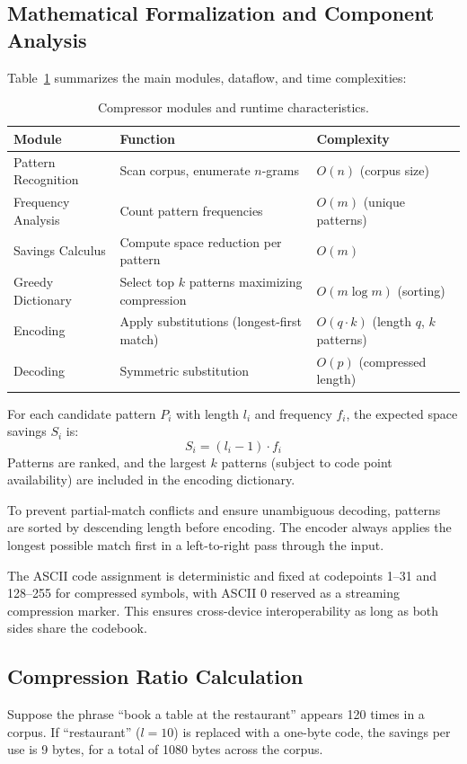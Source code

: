 \documentclass[12pt,openany]{article}
\theoremstyle{definition}
\theoremstyle{definition}
\theoremstyle{definition}
\begin{document}
\subsection*{Mathematical Formalization and Component Analysis}
Table~\ref{tab:compressor-modules} summarizes the main modules, dataflow, and time complexities:
\begin{table}[ht]
\begin{adjustwidth}{-5cm}{-5cm}
\centering
\begin{tabular}{|l|l|l|}
\hline
\textbf{Module} & \textbf{Function} & \textbf{Complexity} \\
\hline
Pattern Recognition   & Scan corpus, enumerate $n$-grams          & $O(n)$ (corpus size) \\
Frequency Analysis    & Count pattern frequencies                 & $O(m)$ (unique patterns) \\
Savings Calculus      & Compute space reduction per pattern       & $O(m)$ \\
Greedy Dictionary     & Select top $k$ patterns maximizing compression & $O(m\log m)$ (sorting) \\
Encoding              & Apply substitutions (longest-first match) & $O(q\cdot k)$ (length $q$, $k$ patterns) \\
Decoding              & Symmetric substitution                   & $O(p)$ (compressed length) \\
\hline
\end{tabular}
\caption{Compressor modules and runtime characteristics.}
\label{tab:compressor-modules}
\end{adjustwidth}
\end{table}
For each candidate pattern $P_i$ with length $l_i$ and frequency $f_i$, the expected space savings $S_i$ is:
\[
S_i = (l_i - 1) \cdot f_i
\]
Patterns are ranked, and the largest $k$ patterns (subject to code point availability) are included in the encoding dictionary.

To prevent partial-match conflicts and ensure unambiguous decoding, patterns are sorted by descending length before encoding. The encoder always applies the longest possible match first in a left-to-right pass through the input.

The ASCII code assignment is deterministic and fixed at codepoints 1--31 and 128--255 for compressed symbols, with ASCII 0 reserved as a streaming compression marker. This ensures cross-device interoperability as long as both sides share the codebook.

\subsection*{Compression Ratio Calculation}
Suppose the phrase ``book a table at the restaurant'' appears 120 times in a corpus. If ``restaurant'' ($l=10$) is replaced with a one-byte code, the savings per use is 9 bytes, for a total of 1080 bytes across the corpus.
\end{document}
